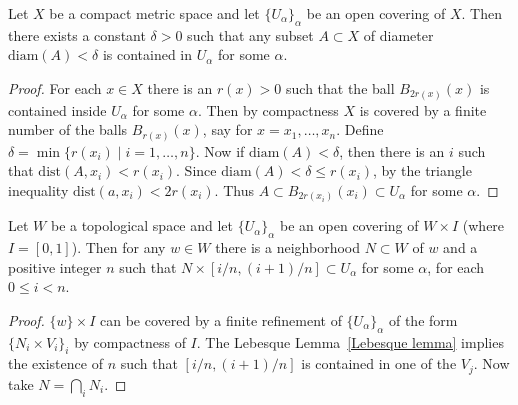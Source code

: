 \begin{lem}\label{Lebesque lemma}
    Let $X$ be a compact metric space and let $\{U_\alpha\}_\alpha$ be an open covering of $X$. Then there exists a constant $ \delta >0$ such that any subset $A\subset X$ of diameter $\mathrm{diam} (A)<\delta$ is contained in $U_\alpha$ for some $\alpha$.
\end{lem}
\begin{proof}
    For each $x\in X$ there is an $r(x)>0$ such that the ball $B_{2r(x)}(x)$ is contained inside $U_\alpha$ for some $\alpha$. Then by compactness $X$ is covered by a finite number of the balls $B_{r(x)}(x)$, say for $x=x_1,\ldots,x_n$. Define $\delta=\min \{r(x_i)\mid i=1,\ldots,n\}$. Now if $\mathrm{diam} (A)<\delta$, then there is an $i$ such that $\mathrm{dist}(A,x_i)<r(x_i)$. Since $\mathrm{diam}(A)<\delta\leq r(x_i)$, by the triangle inequality $\mathrm{dist}(a,x_i)<2r(x_i)$. Thus $A\subset B_{2r(x_i)}(x_i)\subset U_\alpha$ for some $\alpha$.
\end{proof}
\begin{lem}\label{Lemma 3.2 Bredon}
    Let $W$ be a topological space and let $\{U_\alpha\}_\alpha$ be an open covering of $W\times I$ (where $I=[0,1]$).  Then for any $w\in W$ there is a neighborhood $N\subset W$ of $w$ and a positive integer $n$ such that $N\times [i/n, (i+1)/n]\subset U_\alpha$ for some $\alpha$, for each $0\leq i <n$.
\end{lem}
\begin{proof}
    $\{w\}\times I$ can be covered by a finite refinement of $\{U_\alpha\}_\alpha$ of the form $\{N_i\times V_i\}_i$ by compactness of $I$. The Lebesque Lemma~\ref{Lebesque lemma} implies the existence of $n$ such that $[i/n,(i+1)/n]$ is contained in one of the $V_j$. Now take $N=\bigcap_i N_i$.
\end{proof}

